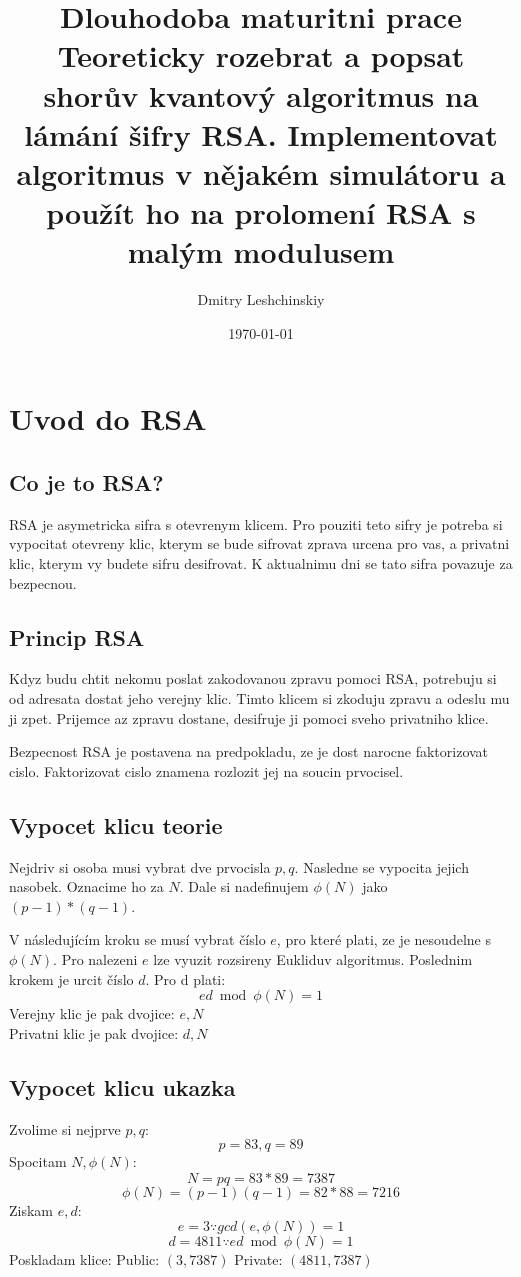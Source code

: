 \documentclass[11pt]{article}
\title{Dlouhodoba maturitni prace \\
\large Teoreticky rozebrat a popsat shorův kvantový algoritmus na lámání šifry RSA. Implementovat algoritmus v nějakém simulátoru a použít ho na prolomení RSA s malým modulusem}
\author{Dmitry Leshchinskiy}
\date{\today}
\begin{document}
\maketitle
\newpage

\tableofcontents
\newpage

\section{Uvod do RSA}
\subsection{Co je to RSA?}

RSA je asymetricka sifra s otevrenym klicem. Pro pouziti teto sifry je potreba si vypocitat otevreny klic, kterym se bude sifrovat zprava urcena pro vas, a privatni klic, kterym vy budete sifru desifrovat. K aktualnimu dni se tato sifra povazuje za bezpecnou.

\subsection{Princip RSA}
Kdyz budu chtit nekomu poslat zakodovanou zpravu pomoci RSA, potrebuju si od adresata dostat jeho verejny klic. Timto klicem si zkoduju zpravu a odeslu mu ji zpet. Prijemce az zpravu dostane, desifruje ji pomoci sveho privatniho klice.
\par Bezpecnost RSA je postavena na predpokladu, ze je dost narocne faktorizovat cislo. Faktorizovat cislo znamena rozlozit jej na soucin prvocisel.

\subsection{Vypocet klicu teorie}
Nejdriv si osoba musi vybrat dve prvocisla $p, q$.
Nasledne se vypocita jejich nasobek. Oznacime ho za $N$.
Dale si nadefinujem $\phi (N)$ jako $(p - 1) * (q - 1)$.
\par V následujícím kroku se musí vybrat číslo $e$, pro které plati, ze je nesoudelne s $\phi (N)$.
Pro nalezeni $e$ lze vyuzit rozsireny Eukliduv algoritmus.
Poslednim krokem je urcit číslo $d$. Pro d plati:
$$ ed \bmod \phi (N) = 1 $$
Verejny klic je pak dvojice: $e, N$ \\
Privatni klic je pak dvojice: $d, N$

\subsection{Vypocet klicu ukazka}
\noindent Zvolime si nejprve $p, q$:
$$p = 83, q = 89$$
Spocitam $N, \phi (N)$:
$$N = pq = 83 * 89 = 7387$$
$$\phi (N) = (p - 1)(q - 1) = 82 * 88 = 7216$$
Ziskam $e, d$:
$$e = 3 \because gcd(e, \phi (N)) = 1$$
$$d = 4811 \because ed \bmod \phi (N) = 1$$
Poskladam klice:
Public: $(3, 7387)$
Private: $(4811, 7387)$
\end{document}
